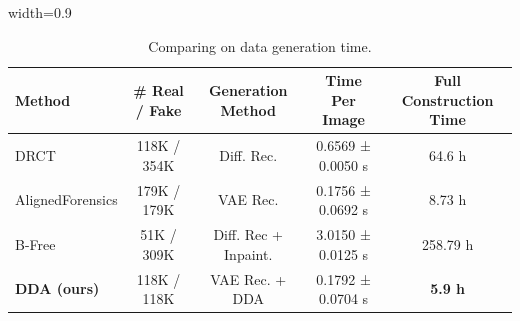 \documentclass{article}
\begin{document}
\begin{table}[tb!]
\centering       
\caption{Comparing on data generation time.}
\label{tab:compare-traing-data}
    \begin{adjustbox}{width=0.9\linewidth}
      \begin{tabular}{lcccc}
      \toprule
      Method & \# Real / Fake & Generation Method & Time Per Image & Full Construction Time \\
      \midrule
      DRCT  & 118K / 354K & Diff. Rec. & 0.6569 ± 0.0050 s & 64.6 h \\
      AlignedForensics & 179K / 179K & VAE Rec. &  0.1756 ± 0.0692 s & 8.73 h \\ 
      B-Free & 51K / 309K & Diff. Rec + Inpaint. & 3.0150 ± 0.0125 s & 258.79 h \\
      \midrule
      \rowcolor{myblue}
      \textbf{DDA (ours)} & 118K / 118K & VAE Rec. + DDA & 0.1792 ± 0.0704 s & \textbf{5.9 h} \\
      \bottomrule
      \end{tabular}
    \end{adjustbox}
    \vspace{-10pt}
\end{table}
\end{document}
